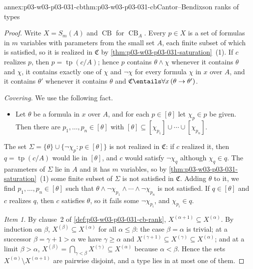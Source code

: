 \begin{annexitem}{annex:p03-w03-p03-031-cb}{thm:p03-w03-p03-031-cb}{Cantor--Bendixson ranks of types}
\begin{proof}
Write \(X=S_m(A)\) and \(\operatorname{CB}\) for \(\operatorname{CB}_A\).
Every \(p\in X\) is a set of formulas in \(m\) variables with parameters
from the small set \(A\), each finite subset of which is satisfied, so it is
realized in \(\mathfrak C\) by \cref{thm:p03-w03-p03-031-saturation}~(1).
If \(c\) realizes \(p\), then \(p=\operatorname{tp}(c/A)\); hence \(p\)
contains \(\theta\wedge\chi\) whenever it contains \(\theta\) and \(\chi\),
it contains exactly one of \(\chi\) and \(\neg\chi\) for every formula
\(\chi\) in \(x\) over \(A\), and it contains \(\theta'\) whenever it
contains \(\theta\) and \(\mathfrak C\entails\forall x\,(\theta\to\theta')\).

\emph{Covering.}  We use the following fact.
\begin{itemize}
  \item[\((\ast)\)] Let \(\theta\) be a formula in \(x\) over \(A\), and for
        each \(p\in[\theta]\) let \(\chi_p\in p\) be given.  Then there are
        \(p_1,\ldots,p_n\in[\theta]\) with
        \([\theta]\subseteq[\chi_{p_1}]\cup\cdots\cup[\chi_{p_n}]\).
\end{itemize}
The set \(\Sigma=\{\theta\}\cup\{\neg\chi_p:p\in[\theta]\}\) is not realized
in \(\mathfrak C\): if \(c\) realized it, then
\(q=\operatorname{tp}(c/A)\) would lie in \([\theta]\), and \(c\) would
satisfy \(\neg\chi_q\) although \(\chi_q\in q\).  The parameters of
\(\Sigma\) lie in \(A\) and it has \(m\) variables, so by
\cref{thm:p03-w03-p03-031-saturation}~(1) some finite subset of \(\Sigma\)
is not satisfied in \(\mathfrak C\).  Adding \(\theta\) to it, we find
\(p_1,\ldots,p_n\in[\theta]\) such that
\(\theta\wedge\neg\chi_{p_1}\wedge\cdots\wedge\neg\chi_{p_n}\) is not
satisfied.  If \(q\in[\theta]\) and \(c\) realizes \(q\), then \(c\)
satisfies \(\theta\), so it fails some \(\neg\chi_{p_i}\), and
\(\chi_{p_i}\in q\).

\emph{Item 1.}  By clause~2 of \cref{def:p03-w03-p03-031-cb-rank},
\(X^{(\alpha+1)}\subseteq X^{(\alpha)}\).  By induction on \(\beta\),
\(X^{(\beta)}\subseteq X^{(\alpha)}\) for all \(\alpha\leq\beta\): the case
\(\beta=\alpha\) is trivial; at a successor \(\beta=\gamma+1>\alpha\) we
have \(\gamma\geq\alpha\) and \(X^{(\gamma+1)}\subseteq
X^{(\gamma)}\subseteq X^{(\alpha)}\); and at a limit \(\beta>\alpha\),
\(X^{(\beta)}=\bigcap_{\gamma<\beta}X^{(\gamma)}\subseteq X^{(\alpha)}\)
because \(\alpha<\beta\).  Hence the sets
\(X^{(\alpha)}\setminus X^{(\alpha+1)}\) are pairwise disjoint, and a type
lies in at most one of them.


\end{proof}
\end{annexitem}
